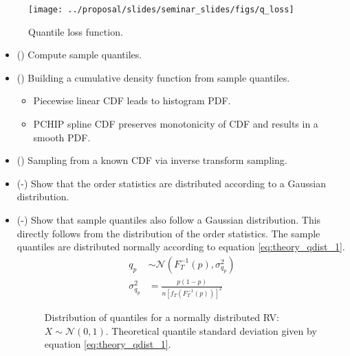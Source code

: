 \begin{figure}[H]
    \centering
    \texttt{[image: ../proposal/slides/seminar\_slides/figs/q\_loss]}
    \caption[Quantile loss function.]{Quantile loss function.}
    \label{fig:qloss}
\end{figure}



\begin{itemize}
        \item (\checkmark) Compute sample quantiles.
        \item (\checkmark) Building a cumulative density function from sample quantiles.
        \begin{itemize}
           \item Piecewise linear CDF leads to histogram PDF.
           \item PCHIP spline CDF preserves monotonicity of CDF and results in a smooth PDF. \cite{Fritsch80}
        \end{itemize}
        \item (\checkmark) Sampling from a known CDF via inverse transform sampling.
        \item (\checkmark-) Show that the order statistics are distributed according to a Gaussian distribution.
        \item (\checkmark-) Show that sample quantiles also follow a Gaussian distribution.  This directly follows from the distribution of the order statistics.
            The sample quantiles are distributed normally according to equation \ref{eq:theory_qdist_1}.
        \begin{eqnarray}
        q_p &\sim \mathcal N \left( F_T^{-1}(p), \sigma^2_{q_p} \right) \\
        \sigma^2_{q_p} &= \frac{p(1 - p)}{n[f_T(F_T^{-1}(p))]^2}
        \label{eq:theory_qdist_1}
        \end{eqnarray}
        


\begin{figure}[]%
    \centering
    \qquad
    \qquad
    \qquad
    \qquad
    \caption[Distribution of quantiles for a normally distributed RV.]{Distribution of quantiles for a normally distributed RV: $X \sim \mathcal{N}(0, 1)$.  Theoretical quantile standard deviation given by equation \ref{eq:theory_qdist_1}.}%
    \label{fig:normal_q_theory}%
\end{figure}


\end{itemize}
